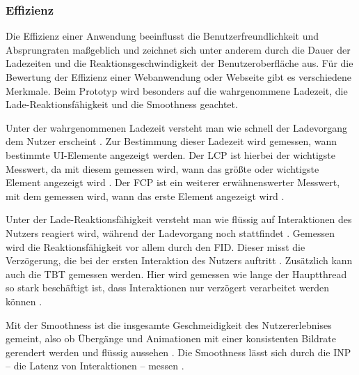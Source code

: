 \subsubsection{Effizienz}\label{sec:PerformanceBasics}
Die Effizienz einer Anwendung beeinflusst die Benutzerfreundlichkeit und Absprungraten maßgeblich und zeichnet sich unter anderem durch die Dauer der Ladezeiten und die Reaktionsgeschwindigkeit der Benutzeroberfläche aus. Für die Bewertung der Effizienz einer Webanwendung oder Webseite gibt es verschiedene Merkmale. Beim Prototyp wird besonders auf die wahrgenommene Ladezeit, die Lade-Reaktionsfähigkeit und die Smoothness geachtet. 

Unter der wahrgenommenen Ladezeit versteht man wie schnell der Ladevorgang dem Nutzer erscheint \cite[Abschnitt~4]{PerformanceMetrics}. Zur Bestimmung dieser Ladezeit wird gemessen, wann bestimmte \ac{UI}-Elemente angezeigt werden. Der \ac{LCP} ist hierbei der wichtigste Messwert, da mit diesem gemessen wird, wann das größte oder wichtigste Element angezeigt wird \cite{LCP}. Der \ac{FCP} ist ein weiterer erwähnenswerter Messwert, mit dem gemessen wird, wann das erste Element angezeigt wird \cite{FCP}.

Unter der Lade-Reaktionsfähigkeit versteht man wie flüssig auf Interaktionen des Nutzers reagiert wird, während der Ladevorgang noch stattfindet \cite[Abschnitt~4]{PerformanceMetrics}. Gemessen wird die Reaktionsfähigkeit vor allem durch den \ac{FID}. Dieser misst die Verzögerung, die bei der ersten Interaktion des Nutzers auftritt \cite{FID}. Zusätzlich kann auch die \ac{TBT} gemessen werden. Hier wird gemessen wie lange der Hauptthread so stark beschäftigt ist, dass Interaktionen nur verzögert verarbeitet werden können \cite{TBT}.

Mit der Smoothness ist die insgesamte Geschmeidigkeit des Nutzererlebnises gemeint, also ob Übergänge und Animationen mit einer konsistenten Bildrate gerendert werden und flüssig aussehen \cite[Abschnitt~4]{PerformanceMetrics}. Die Smoothness lässt sich durch die \ac{INP} – die Latenz von Interaktionen – messen \cite{INP}.
